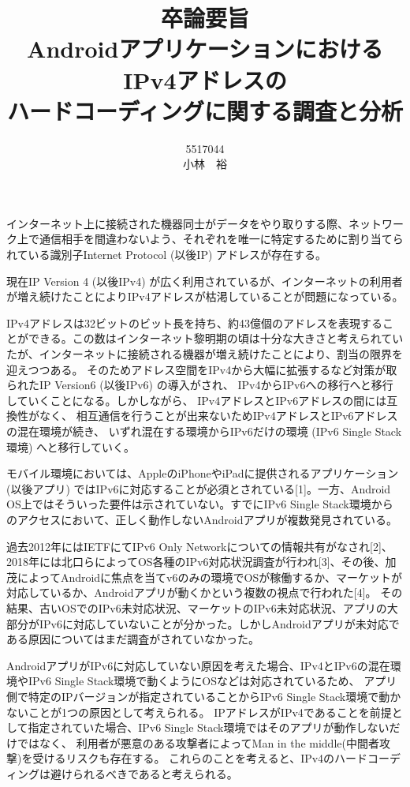 \documentclass[twocolumn, 10pt, a4paper]{jarticle}
\title{\vspace{-3cm}
{\large 卒論要旨}\\
{\bf
AndroidアプリケーションにおけるIPv4アドレスの\\ハードコーディングに関する調査と分析
}
}
\author{
5517044 \\		%
小林　裕		%
}
\date{}
\begin{document}
\maketitle
\thispagestyle{empty}

インターネット上に接続された機器同士がデータをやり取りする際、ネットワーク上で通信相手を間違わないよう、それぞれを唯一に特定するために割り当てられている識別子Internet Protocol (以後IP) アドレスが存在する。

現在IP Version 4 (以後IPv4) が広く利用されているが、インターネットの利用者が増え続けたことによりIPv4アドレスが枯渇していることが問題になっている。

IPv4アドレスは32ビットのビット長を持ち、約43億個のアドレスを表現することができる。この数はインターネット黎明期の頃は十分な大きさと考えられていたが、インターネットに接続される機器が増え続けたことにより、割当の限界を迎えつつある。
そのためアドレス空間をIPv4から大幅に拡張するなど対策が取られたIP Version6 (以後IPv6) の導入がされ、
IPv4からIPv6への移行へと移行していくことになる。しかしながら、
IPv4アドレスとIPv6アドレスの間には互換性がなく、
相互通信を行うことが出来ないためIPv4アドレスとIPv6アドレスの混在環境が続き、
いずれ混在する環境からIPv6だけの環境 (IPv6 Single Stack環境) へと移行していく。

モバイル環境においては、AppleのiPhoneやiPadに提供されるアプリケーション (以後アプリ) ではIPv6に対応することが必須とされている[1]。一方、Android OS上ではそういった要件は示されていない。すでにIPv6 Single Stack環境からのアクセスにおいて、正しく動作しないAndroidアプリが複数発見されている。

過去2012年にはIETFにてIPv6 Only Networkについての情報共有がなされ[2]、2018年には北口らによってOS各種のIPv6対応状況調査が行われ[3]、その後、加茂によってAndroidに焦点を当てv6のみの環境でOSが稼働するか、マーケットが対応しているか、Androidアプリが動くかという複数の視点で行われた[4]。
その結果、古いOSでのIPv6未対応状況、マーケットのIPv6未対応状況、アプリの大部分がIPv6に対応していないことが分かった。しかしAndroidアプリが未対応である原因についてはまだ調査がされていなかった。

AndroidアプリがIPv6に対応していない原因を考えた場合、IPv4とIPv6の混在環境やIPv6 Single Stack環境で動くようにOSなどは対応されているため、
アプリ側で特定のIPバージョンが指定されていることからIPv6 Single Stack環境で動かないことが1つの原因として考えられる。
IPアドレスがIPv4であることを前提として指定されていた場合、IPv6 Single Stack環境ではそのアプリが動作しないだけではなく、
利用者が悪意のある攻撃者によってMan in the middle(中間者攻撃)を受けるリスクも存在する。
これらのことを考えると、IPv4のハードコーディングは避けられるべきであると考えられる。
\end{document}
